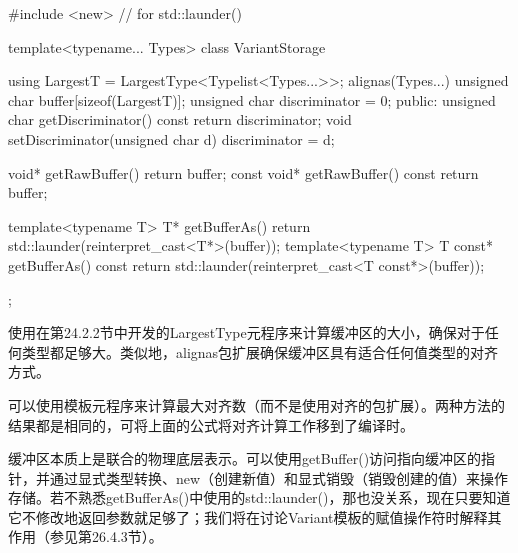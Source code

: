 \begin{cpp}
#include <new> // for std::launder()

template<typename... Types>
class VariantStorage {
	using LargestT = LargestType<Typelist<Types...>>;
	alignas(Types...) unsigned char buffer[sizeof(LargestT)];
	unsigned char discriminator = 0;
	public:
	unsigned char getDiscriminator() const { return discriminator; }
	void setDiscriminator(unsigned char d) { discriminator = d; }
	
	void* getRawBuffer() { return buffer; }
	const void* getRawBuffer() const { return buffer; }
	
	template<typename T>
		T* getBufferAs() { return std::launder(reinterpret_cast<T*>(buffer)); }
	template<typename T>
		T const* getBufferAs() const {
			return std::launder(reinterpret_cast<T const*>(buffer));
		}
};
\end{cpp}

使用在第24.2.2节中开发的LargestType元程序来计算缓冲区的大小，确保对于任何类型都足够大。类似地，alignas包扩展确保缓冲区具有适合任何值类型的对齐方式。

\begin{notice}
可以使用模板元程序来计算最大对齐数（而不是使用对齐的包扩展）。两种方法的结果都是相同的，可将上面的公式将对齐计算工作移到了编译时。
\end{notice}

缓冲区本质上是联合的物理底层表示。可以使用getBuffer()访问指向缓冲区的指针，并通过显式类型转换、new（创建新值）和显式销毁（销毁创建的值）来操作存储。若不熟悉getBufferAs()中使用的std::launder()，那也没关系，现在只要知道它不修改地返回参数就足够了；我们将在讨论Variant模板的赋值操作符时解释其作用（参见第26.4.3节）。






































